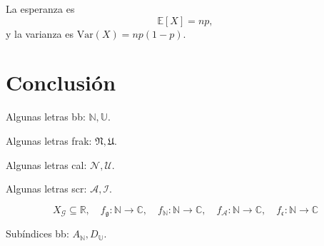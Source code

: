 La esperanza es
\begin{equation}
  \mathbb{E}[X] = np,
\end{equation}
y la varianza es $\mathrm{Var}(X) = np(1-p)$.

\lipsum[11-12]

\section{Conclusión}
\lipsum[13-14]

Algunas letras bb: $\mathbb{N},\mathbb{U}$. 

Algunas letras frak: $\mathfrak{N},\mathfrak{U}$. 

Algunas letras cal: $\mathcal{N},\mathcal{U}$. 

Algunas letras scr: $\mathscr{A},\mathscr{I}$.

\[
  X_{\mathcal{G}} \subseteq \mathbb{R},\quad
  f_{\mathfrak{g}} : \mathbb{N} \to \mathbb{C},\quad
  f_{\mathbb{N}} : \mathbb{N} \to \mathbb{C},\quad
  f_{\mathscr{A}} : \mathbb{N} \to \mathbb{C},\quad
  f_{\mathfrak{c}} : \mathbb{N} \to \mathbb{C}
\]

Subíndices bb: \(A_\mathbb{N},D_\mathbb{U}\).